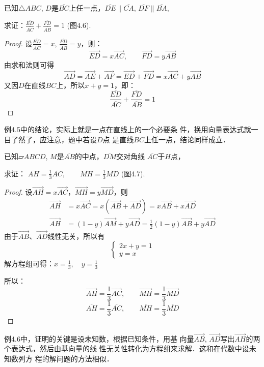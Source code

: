 \begin{example}
    已知$\triangle ABC$, $D$是$\overline{BC}$上任一点，$\overline{DE}\parallel \overline{CA}$, 
$\overline{DF}\parallel\overline{BA}$, 

求证：$\frac{\overline{ED}}{\overline{AC}}+\frac{\overline{FD}}{\overline{AB}}=1$ (图4.6).
\end{example}

\begin{proof}
设$\frac{\overline{ED}}{\overline{AC}}=x$, $\frac{\overline{FD}}{\overline{AB}}=y$，则：
\[\Vec{ED}=x\Vec{AC},\qquad \Vec{FD}=y\Vec{AB}\]
由求和法则可得
\[\Vec{AD}=\Vec{AE}+\Vec{AF}=\Vec{ED}+\Vec{FD}=x\Vec{AC}+y\Vec{AB}\]
又因$D$在直线$BC$上，所以$x+y=1$，即：
$$\frac{\overline{ED}}{\overline{AC}}+\frac{\overline{FD}}{\overline{AB}}=1$$
\end{proof}

例4.5中的结论，实际上就是一点在直线上的一个必要条
件，换用向量表达式就一目了然了，应注意，题中若设$D$点
是直线$BC$上任一点，结论同样成立．


\begin{example}
    已知$\parallelogram ABCD$, $M$是$\overline{AB}$的中点，$\overline{DM}$交对角线
$\overline{AC}$于$H$点，

求证：
$\overline{AH}=\frac{1}{3} \overline{AC},\qquad \overline{MH}=\frac{1}{3} \overline{MD}$ (图4.7).
\end{example}

\begin{proof}
设$\Vec{AH}=x\Vec{AC}$，$\Vec{MH}=y\Vec{MD}$，则
\[\begin{split}
    \Vec{AH}&=x\Vec{AC}=x\left(\Vec{AB}+\Vec{AD}\right)=x\Vec{AB}+x\Vec{AD}\\
    \Vec{AH}&=(1-y)\Vec{AM}+y\Vec{AD}=\frac{1}{2}(1-y)\Vec{AB}+y\Vec{AD}
\end{split}\]
由于$\Vec{AB}$、$\Vec{AD}$线性无关，所以有
\[\begin{cases}
    2x+y=1\\
    y=x
\end{cases}\]
解方程组可得：$x=\frac{1}{3},\quad y=\frac{1}{3}$

所以：
\[\Vec{AH}=\frac{1}{3}\Vec{AC},\qquad \Vec{MH}=\frac{1}{3}\Vec{MD}\]
\[\overline{AH}=\frac{1}{3}\overline{AC},\qquad \overline{MH}=\frac{1}{3}\overline{MD}\]
\end{proof}

例4.6中，证明的关键是设未知数，根据已知条件，用基
向量$\Vec{AB}$, $\Vec{AD}$写出$\Vec{AH}$的两个表达式，然后由基向量的线
性无关性转化为方程组来求解．这和在代数中设未知数列方
程的解问题的方法相似．

